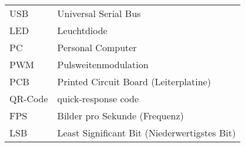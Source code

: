 
\begin{centering}
\begin{tabular}{ | ll | }
    \hline
    USB & Universal Serial Bus \\
    LED & Leuchtdiode \\
    PC & Personal Computer \\
    PWM & Pulsweitenmodulation \\
    PCB & Printed Circuit Board (Leiterplatine) \\
    QR-Code & quick-response code \\
    FPS & Bilder pro Sekunde (Frequenz) \\
    LSB & Least Significant Bit (Niederwertigstes Bit) \\
    \hline
\end{tabular}
\label{table:Abkürzungsverzeichnis}
\end{centering}

